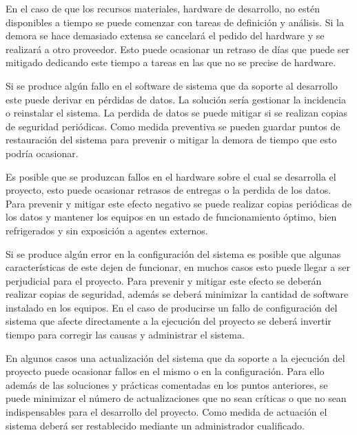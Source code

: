 En el caso de que los recursos materiales, hardware de desarrollo, no estén disponibles a tiempo se puede comenzar con tareas de definición y 
análisis. Si la demora se hace demasiado extensa se cancelará el pedido del hardware y se realizará a otro proveedor. Esto puede ocasionar
un retraso de días que puede ser mitigado dedicando este tiempo a tareas en las que no se precise de hardware. 

Si se produce algún fallo en el software de sistema que da soporte al desarrollo este puede derivar en pérdidas de datos. La solución sería gestionar la incidencia
o reinstalar el sistema. La perdida de datos se puede mitigar si se realizan copias de seguridad periódicas. Como medida preventiva se pueden guardar puntos de restauración del sistema
para prevenir o mitigar la demora de tiempo que esto podría ocasionar.

Es posible que se produzcan fallos en el hardware sobre el cual se desarrolla el proyecto, esto puede ocasionar retrasos de entregas o la perdida de los datos. 
Para prevenir y mitigar este efecto negativo se puede realizar copias periódicas de los datos y mantener los equipos en un estado de funcionamiento óptimo, bien refrigerados 
y sin exposición a agentes externos. 

Si se produce algún error en la configuración del sistema es posible que algunas características de este dejen de funcionar, en muchos casos esto puede llegar a ser perjudicial para 
el proyecto. Para prevenir y mitigar este efecto se deberán realizar copias de seguridad, además se deberá minimizar la cantidad de software instalado en los equipos. En el caso de producirse un 
fallo de configuración del sistema que afecte directamente a la ejecución del proyecto se deberá invertir tiempo para corregir las causas y administrar el sistema.

En algunos casos una actualización del sistema que da soporte a la ejecución del proyecto puede ocasionar fallos en el mismo o en la configuración. Para ello además de 
las soluciones y prácticas comentadas en los puntos anteriores, se puede minimizar el número de actualizaciones que no sean críticas o que no sean indispensables para 
el desarrollo del proyecto. Como medida de actuación el sistema deberá ser restablecido mediante un administrador cualificado. 

